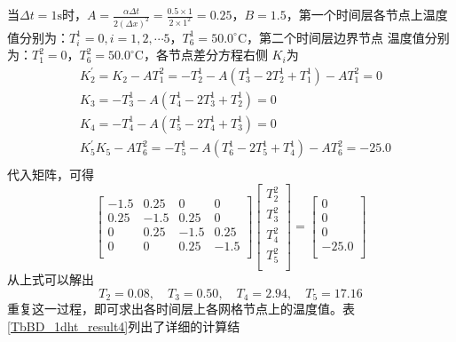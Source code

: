当$\Delta t=1\mathrm{s}$时，$A=\frac{\alpha\Delta t}{2(\Delta
x)^{2}}=\frac{0.5\times1}{2\times1^{2}}=0.25$，$B=1.5$，第一个时间层各节点上温度
值分别为：$T_{i}^{1}=0, i=1,2,\cdots 5$，$T_{6}^{1}=50.0^{\circ}\!\mathrm{C}$，第二个时间层边界节点
温度值分别为：$T_{1}^{2}=0$，$T_{6}^{2}=50.0^{\circ}\!\mathrm{C}$，各节点差分方程右侧
$K_{i}$为
\begin{equation}
\begin{aligned}
    &K_{2}^{\prime} =
    K_{2} - AT_{1}^{2}
    =
  -T_{2}^{1}
  -
  A(T_{3}^{1} - 2T_{2}^{1} + T_{1}^{1})
  - AT_{1}^{2}
  =
  0
    \\
    &K_{3} 
    =
  -T_{3}^{1}
  -
  A(T_{4}^{1} - 2T_{3}^{1} + T_{2}^{1})
  =
  0
    \\
    &K_{4}
    =
  -T_{4}^{1}
  -
  A(T_{5}^{1} - 2T_{4}^{1} + T_{3}^{1})
  =
  0
    \\
    &K_{5}^{\prime} 
    K_{5} - AT_{6}^{2}
    =
  -T_{5}^{1}
  -
  A(T_{6}^{1} - 2T_{5}^{1} + T_{4}^{1})
  - AT_{6}^{2}
  =
  -25.0
    \\
\end{aligned}
\end{equation}
代入矩阵，可得
\begin{equation}
  \begin{bmatrix}
    -1.5 & 0.25 & 0 & 0 \\
    0.25 & -1.5 & 0.25 & 0 \\
    0 & 0.25 & -1.5 & 0.25 \\
    0 & 0 & 0.25 & -1.5 \\
  \end{bmatrix}
  \begin{bmatrix}
    T_{2}^{2} \\
    T_{3}^{2} \\
    T_{4}^{2} \\
    T_{5}^{2} \\
  \end{bmatrix}
  =
  \begin{bmatrix}
    0 \\
    0 \\
    0 \\
    -25.0 \\
  \end{bmatrix}
\end{equation}
从上式可以解出
\begin{equation}
  T_{2} = 0.08, \quad
  T_{3} = 0.50, \quad
  T_{4} = 2.94, \quad
  T_{5} = 17.16
\end{equation}
重复这一过程，即可求出各时间层上各网格节点上的温度值。表\ref{TbBD_1dht_result4}列出了详细的计算结
